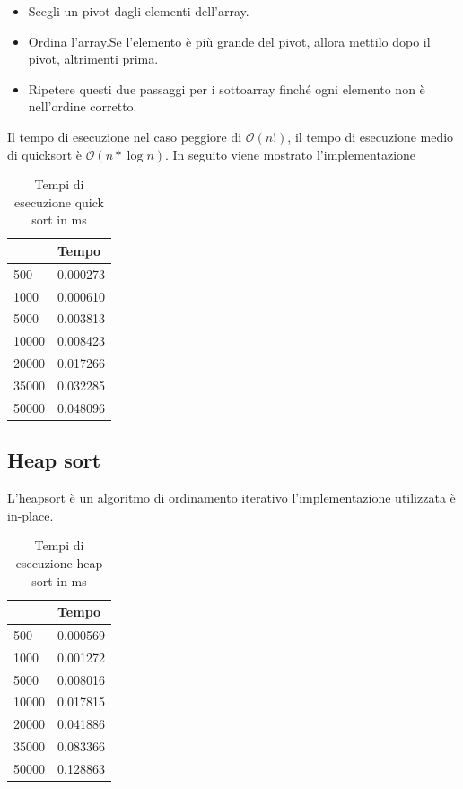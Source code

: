 \documentclass[12pt, a4paper]{report}
\begin{document}
\begin{itemize}
\item Scegli un pivot dagli elementi dell'array.
\item Ordina l'array.Se l'elemento è più grande del pivot, allora mettilo dopo il pivot, altrimenti prima.
\item Ripetere questi due passaggi per i sottoarray finché ogni elemento non è nell'ordine corretto.
\end{itemize}

Il tempo di esecuzione nel caso peggiore di $\mathcal{O}(n!) $, il tempo di esecuzione medio di quicksort è $\mathcal{O}(n * \log{}n) $. In seguito viene mostrato l'implementazione 

	

\begin{table}[ht]
\centering
\begin{tabular}{| l | l |}
\hline
 & Tempo \\ \hline
500 & 0.000273 \\ \hline
1000 & 0.000610 \\ \hline
5000 & 0.003813 \\ \hline
10000 & 0.008423 \\ \hline
20000 & 0.017266 \\ \hline
35000 & 0.032285 \\ \hline
50000 & 0.048096 \\ \hline

\end{tabular}
\caption{Tempi di esecuzione quick sort in ms}
\label{Tab:Tempi esecuzione QuickSort}
\end{table}

\subsection{Heap sort}
L'heapsort è un algoritmo di ordinamento iterativo l'implementazione utilizzata è in-place.

	

\begin{table}[ht]
\centering
\begin{tabular}{| l | l |}
\hline
 & Tempo \\ \hline
500 & 0.000569 \\ \hline
1000 & 0.001272 \\ \hline
5000 & 0.008016 \\ \hline
10000 & 0.017815 \\ \hline
20000 & 0.041886 \\ \hline
35000 & 0.083366 \\ \hline
50000 & 0.128863 \\ \hline

\end{tabular}
\caption{Tempi di esecuzione heap sort in ms}
\label{Tab:Tempi esecuzione HeapSort}
\end{table}
\end{document}
